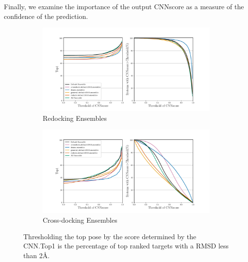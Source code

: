 \documentclass[journal=jcisd8,manuscript=article]{achemso}
\begin{document}
Finally, we examine the importance of the output CNNscore as a measure of the confidence of the prediction. 
\begin{figure}    
        \begin{subfigure}[b]{\textwidth}    
		\centering
		\includegraphics[width=\textwidth]{figures/redocking/thresh_cnnscore_ensembles.pdf}
		\caption{Redocking Ensembles}
		\label{fig:ThreshEnsRD}
        \end{subfigure}    
        \begin{subfigure}[b]{\textwidth}    
		\centering
		\includegraphics[width=\textwidth]{figures/crossdocking/thresh_cnnscore_ensembles.pdf}
		\caption{Cross-docking Ensembles}
                \label{fig:ThreshEnsCD}
        \end{subfigure}
	\caption{Thresholding the top pose by the score determined by the CNN.Top1 is the percentage of top ranked targets with a RMSD less than 2{\AA}.}
	\label{fig:ScoreThresh}
\end{figure} 
\end{document}
